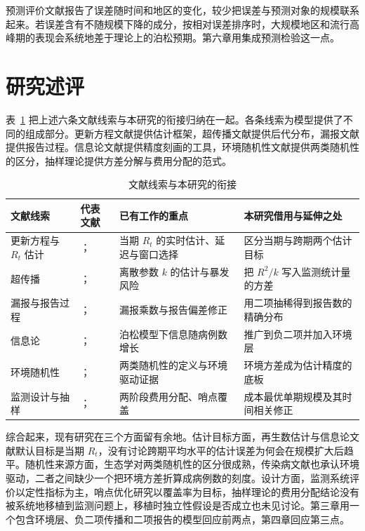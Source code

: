 预测评价文献报告了误差随时间和地区的变化，较少把误差与预测对象的规模联系起来。若误差含有不随规模下降的成分，按相对误差排序时，大规模地区和流行高峰期的表现会系统地差于理论上的泊松预期。第六章用集成预测检验这一点。

\section{研究述评}
\label{sec:lit-review}

表~\ref{tab:lit-lines} 把上述六条文献线索与本研究的衔接归纳在一起。各条线索为模型提供了不同的组成部分。更新方程文献提供估计框架，超传播文献提供后代分布，漏报文献提供报告过程。信息论文献提供精度刻画的工具，环境随机性文献提供两类随机性的区分，抽样理论提供方差分解与费用分配的范式。

\begin{table}[!tbp]
  \centering
  \caption{文献线索与本研究的衔接}
  \label{tab:lit-lines}
  \small
  \begin{tabularx}{\textwidth}{@{}p{2.2cm}p{3.0cm}XX@{}}
    \toprule
    文献线索 & 代表文献 & 已有工作的重点 & 本研究借用与延伸之处 \\
    \midrule
    更新方程与 $R_t$ 估计 & \citet{cori2013new}；\citet{gostic2020practical} & 当期 $R_t$ 的实时估计、延迟与窗口选择 & 区分当期与跨期两个估计目标 \\
    超传播 & \citet{lloydsmith2005superspreading}；\citet{endo2020estimating} & 离散参数 $k$ 的估计与暴发风险 & 把 $R^2/k$ 写入监测统计量的方差 \\
    漏报与报告过程 & \citet{gibbons2014measuring}；\citet{steutel1979discrete} & 漏报乘数与报告偏差修正 & 用二项抽稀得到报告数的精确分布 \\
    信息论 & \citet{parag2022quantifying}；\citet{parag2025asymmetric} & 泊松模型下信息随病例数增长 & 推广到负二项并加入环境层 \\
    环境随机性 & \citet{engen1998demographic}；\citet{shaman2010absolute} & 两类随机性的定义与环境驱动证据 & 环境方差成为估计精度的底板 \\
    监测设计与抽样 & \citet{cochran1977sampling}；\citet{polgreen2009optimizing} & 两阶段费用分配、哨点覆盖 & 成本最优单期规模及其时间相关修正 \\
    \bottomrule
  \end{tabularx}
\end{table}

综合起来，现有研究在三个方面留有余地。估计目标方面，再生数估计与信息论文献默认目标是当期 $R_t$，没有讨论跨期平均水平的估计误差为何会在规模扩大后趋平。随机性来源方面，生态学对两类随机性的区分很成熟，传染病文献也承认环境驱动，二者之间缺少一个把环境方差折算成病例数的刻度。设计方面，监测系统评价以定性指标为主，哨点优化研究以覆盖率为目标，抽样理论的费用分配结论没有被系统地移植到监测问题上，移植时独立性假设是否成立也未见讨论。第三章用一个包含环境层、负二项传播和二项报告的模型回应前两点，第四章回应第三点。

